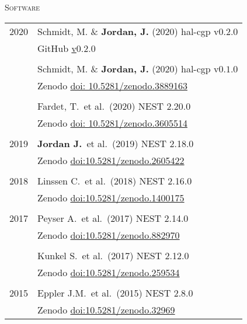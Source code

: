 \textsc{Software}
\begin{longtable}{>{\hfill}p{1.6cm} p{}}
  2020 & Schmidt, M. \& \textbf{Jordan, J.} (2020) hal-cgp v$0.2.0$ \\
       & \footnotesize GitHub \href{https://github.com/Happy-Algorithms-League/hal-cgp/releases/tag/0.2.0}{v$0.2.0$} \\
  \multicolumn{2}{c}{} \\
       & Schmidt, M. \& \textbf{Jordan, J.} (2020) hal-cgp v$0.1.0$ \\
       & \footnotesize Zenodo \href{https://doi.org/10.5281/zenodo.3889163}{doi: 10.5281/zenodo.3889163} \\
  \multicolumn{2}{c}{} \\
       & Fardet, T.~et al.~(2020) NEST 2.20.0 \\
       & \footnotesize Zenodo \href{https://doi.org/10.5281/zenodo.3605514}{doi: 10.5281/zenodo.3605514} \\
  \multicolumn{2}{c}{} \\
  2019 & \textbf{Jordan J.}~et al.~(2019) NEST 2.18.0 \\
       & \footnotesize Zenodo \href{https://doi.org/10.5281/zenodo.2605422}{doi:10.5281/zenodo.2605422} \\
  \multicolumn{2}{c}{} \\
  2018 & Linssen C.~et al.~(2018) NEST 2.16.0 \\
       & \footnotesize Zenodo \href{https://doi.org/10.5281/zenodo.1400175}{doi:10.5281/zenodo.1400175} \\
  \multicolumn{2}{c}{} \\
  2017 & Peyser A.~et al.~(2017) NEST 2.14.0 \\
       & \footnotesize Zenodo \href{https://doi.org/10.5281/zenodo.882970}{doi:10.5281/zenodo.882970} \\
  \multicolumn{2}{c}{} \\
  & Kunkel S.~et al.~(2017) NEST 2.12.0 \\
       & \footnotesize Zenodo \href{http://dx.doi.org/10.5281/zenodo.259534}{doi:10.5281/zenodo.259534} \\
  \multicolumn{2}{c}{} \\
  2015 & Eppler J.M.~et al.~(2015) NEST 2.8.0 \\
       & \footnotesize Zenodo \href{http://dx.doi.org/10.5281/zenodo.32969}{doi:10.5281/zenodo.32969}
\end{longtable}



